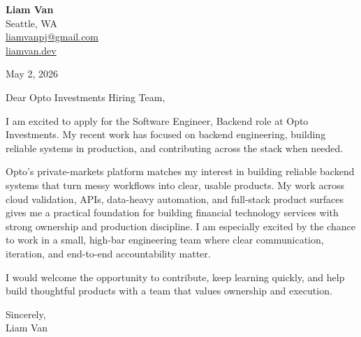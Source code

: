 \documentclass[letterpaper,11pt]{article}
\begin{document}
\begin{flushleft}
\textbf{\Large Liam Van} \\
Seattle, WA \\
\href{mailto:liamvanpj@gmail.com}{liamvanpj@gmail.com} \\
\href{https://liamvan.dev}{liamvan.dev}
\end{flushleft}

May 2, 2026

\noindent Dear Opto Investments Hiring Team,

\noindent I am excited to apply for the Software Engineer, Backend role at Opto Investments. My recent work has focused on backend engineering, building reliable systems in production, and contributing across the stack when needed.

\noindent Opto's private-markets platform matches my interest in building reliable backend systems that turn messy workflows into clear, usable products. My work across cloud validation, APIs, data-heavy automation, and full-stack product surfaces gives me a practical foundation for building financial technology services with strong ownership and production discipline. I am especially excited by the chance to work in a small, high-bar engineering team where clear communication, iteration, and end-to-end accountability matter.

\noindent I would welcome the opportunity to contribute, keep learning quickly, and help build thoughtful products with a team that values ownership and execution.

\noindent Sincerely, \\
Liam Van
\end{document}
